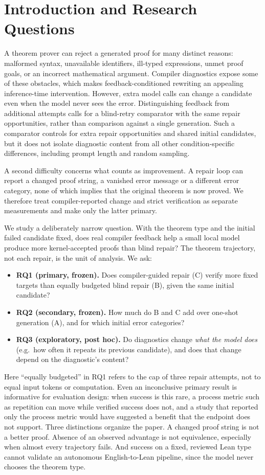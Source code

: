 \documentclass[runningheads,a4paper]{llncs}
\begin{document}
\section{Introduction and Research Questions}
A theorem prover can reject a generated proof for many distinct reasons:
malformed syntax, unavailable identifiers, ill-typed expressions, unmet proof
goals, or an incorrect mathematical argument. Compiler diagnostics expose some of
these obstacles, which makes feedback-conditioned rewriting an appealing
inference-time intervention. However, extra model calls can change a candidate
even when the model never sees the error. Distinguishing feedback from additional attempts calls for a blind-retry comparator with the same repair opportunities, rather than comparison against a single generation. Such a comparator controls for extra repair opportunities and shared initial candidates, but it does not isolate diagnostic content from all other condition-specific differences, including prompt length and random sampling.

A second difficulty concerns what counts as improvement. A repair loop can report a
changed proof string, a vanished error message or a different error category, none
of which implies that the original theorem is now proved. We therefore treat
compiler-reported change and strict verification as separate measurements and make
only the latter primary.

We study a deliberately narrow question. With the theorem type and the initial
failed candidate fixed, does real compiler feedback help a small local model
produce more kernel-accepted proofs than blind repair? The theorem trajectory,
not each repair, is the unit of analysis. We ask:
\begin{itemize}
\item \textbf{RQ1 (primary, frozen).} Does compiler-guided repair (C) verify more
fixed targets than equally budgeted blind repair (B), given the same initial candidate?
\item \textbf{RQ2 (secondary, frozen).} How much do B and C add over one-shot
generation (A), and for which initial error categories?
\item \textbf{RQ3 (exploratory, post hoc).} Do diagnostics change \emph{what the
model does} (e.g.\ how often it repeats its previous candidate), and does that
change depend on the diagnostic's content?
\end{itemize}
Here ``equally budgeted'' in RQ1 refers to the cap of three repair attempts, not to equal input tokens or computation. Even an inconclusive primary result is informative for evaluation design: when
success is this rare, a process metric such as repetition can move while verified
success does not, and a study that reported only the process metric would have
suggested a benefit that the endpoint does not support. Three distinctions organize
the paper. A changed proof string is not a better proof. Absence of an observed
advantage is not equivalence, especially when almost every trajectory fails. And
success on a fixed, reviewed Lean type cannot validate an autonomous English-to-Lean
pipeline, since the model never chooses the theorem type.
\end{document}
